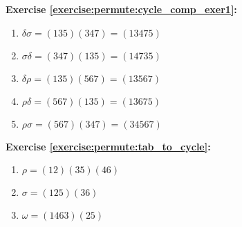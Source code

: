 \noindent\textbf{Exercise \ref{exercise:permute:cycle_comp_exer1}:}
\begin{multicols}{2}
\begin{enumerate}[{a.}]
\item
$\delta \sigma = (135)(347) = (13475)$

\item
$\sigma \delta = (347)(135) = (14735)$

\item
$\delta \rho = (135)(567) = (13567)$

\item
$\rho \delta = (567)(135) = (13675)$


\item
$\rho \sigma = (567)(347) = (34567)$
\end{enumerate}
\end{multicols}


\noindent\textbf{Exercise \ref{exercise:permute:tab_to_cycle}:}
\begin{multicols}{2}
\begin{enumerate}[{a.}]
 
\item
$\rho = (12)(35)(46)$

\item
$\sigma = (125)(36)$

\item
$\omega = (1463)(25)$
\end{enumerate}
\end{multicols}

